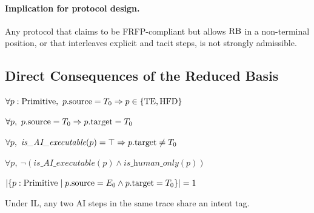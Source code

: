 \paragraph{Implication for protocol design.} Any protocol that claims to be
FRFP-compliant but allows $\mathrm{RB}$ in a non-terminal position, or that interleaves
explicit and tacit steps, is not strongly admissible.

\subsection{Direct Consequences of the Reduced Basis}

\begin{theorem}
$\forall p : \mathrm{Primitive},\ p.\mathrm{source} = \Tobj
\Rightarrow p \in \{\TE, \HFD\}$
\end{theorem}

\begin{theorem}
$\forall p,\ p.\mathrm{source} = T_0 \Rightarrow p.\mathrm{target} = T_0$
\end{theorem}

\begin{theorem}
$\forall p,\ \textit{is\_AI\_executable}(p) = \top \Rightarrow p.\mathrm{target} \neq T_0$
\end{theorem}

\begin{theorem}
$\forall p,\ \neg(\textit{is\_AI\_executable}(p) \wedge \textit{is\_human\_only}(p))$
\end{theorem}

\begin{theorem}
$|\{p : \mathrm{Primitive} \mid p.\mathrm{source} = E_0 \wedge p.\mathrm{target} = T_0\}| = 1$
\end{theorem}

\begin{theorem}
Under IL, any two AI steps in the same trace share an intent tag.
\end{theorem}

